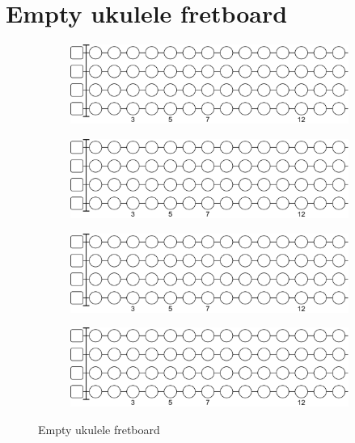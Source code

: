 \chapter{Empty ukulele fretboard} \label{chap:empty_ukulele_fretboard}

\begin{figure}[h]
	\begin{subfigure}[b]{\textwidth}
		\centering
		\includegraphics[width=\textwidth]{../../Images/ukulele_empty_fretboard.png}
	\end{subfigure}
	
	\vspace{0.5cm}
	
	\begin{subfigure}[b]{\textwidth}
		\centering
		\includegraphics[width=\textwidth]{../../Images/ukulele_empty_fretboard.png}
	\end{subfigure}
	
	\vspace{0.5cm}
	
	\begin{subfigure}[b]{\textwidth}
		\centering
		\includegraphics[width=\textwidth]{../../Images/ukulele_empty_fretboard.png}
	\end{subfigure}
	
	\vspace{0.5cm}
	
	\begin{subfigure}[b]{\textwidth}
		\centering
		\includegraphics[width=\textwidth]{../../Images/ukulele_empty_fretboard.png}
	\end{subfigure}
	
	\caption{Empty ukulele fretboard}
\end{figure}